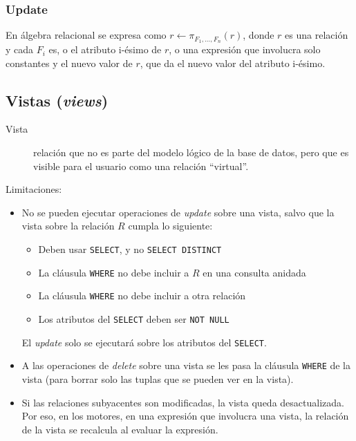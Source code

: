 \documentclass[a4paper, twoside]{article}
\newcommand{\codedir}{../resources/code} %
\begin{document}
\subsubsection{Update}
En álgebra relacional se expresa como $r\leftarrow\pi_{F_{1},\dots,F_{n}}(r)$, donde $r$ es una relación y cada $F_{i}$ es, o el atributo i-ésimo de $r$, o una expresión que involucra solo constantes y el nuevo valor de $r$, que da el nuevo valor del atributo i-ésimo.

\subsection{Vistas (\emph{views})}
\begin{description}
	\item[Vista] relación que no es parte del modelo lógico de la base de datos, pero que es visible para el usuario como una relación ``virtual''.
\end{description}



Limitaciones:
\begin{itemize}
	\item No se pueden ejecutar operaciones de \emph{update} sobre una vista, salvo que la vista sobre la relación $R$ cumpla lo siguiente:
	\begin{itemize}
		\item Deben usar \texttt{SELECT}, y no \texttt{SELECT DISTINCT}
		\item La cláusula \texttt{WHERE} no debe incluir a $R$ en una consulta anidada
		\item La cláusula \texttt{WHERE} no debe incluir a otra relación
		\item Los atributos del \texttt{SELECT} deben ser \texttt{NOT NULL}
	\end{itemize}

	El \emph{update} solo se ejecutará sobre los atributos del \texttt{SELECT}.

	\item A las operaciones de \emph{delete} sobre una vista se les pasa la cláusula \texttt{WHERE} de la vista (para borrar solo las tuplas que se pueden ver en la vista).

	\item Si las relaciones subyacentes son modificadas, la vista queda desactualizada. Por eso, en los motores, en una expresión que involucra una vista, la relación de la vista se recalcula al evaluar la expresión.
\end{itemize}
\end{document}
